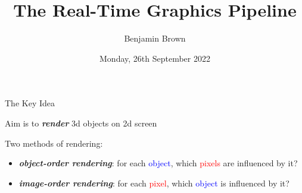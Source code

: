 \documentclass{beamer}
\title[Graphics Pipeline]{The Real-Time Graphics Pipeline}
\author{Benjamin Brown}
\date{Monday, 26th September 2022}
\newcommand{\emphbf}[1]{\textbf{\emph{#1}}}
\begin{document}
\begin{frame}
  \titlepage
\end{frame}


\begin{frame}{The Key Idea}

Aim is to \emphbf{render} 3d objects on 2d screen

\vskip 1cm

Two methods of rendering:

\begin{itemize}
	\item \emphbf{object-order rendering}: for each \textcolor{blue}{object}, which \textcolor{red}{pixels} are influenced by it?
	\item \emphbf{image-order rendering}: for each \textcolor{red}{pixel}, which \textcolor{blue}{object} is influenced by it?
\end{itemize}

\end{frame}
\end{document}
